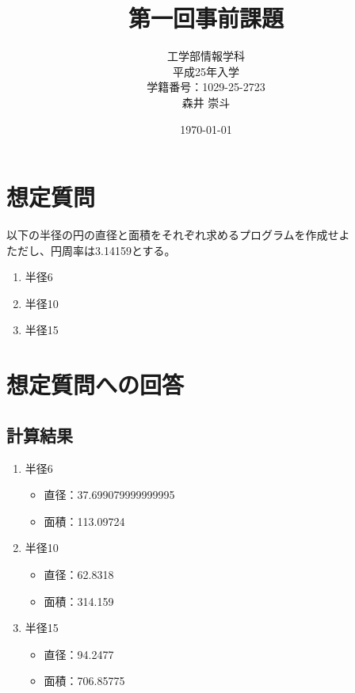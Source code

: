 \documentclass[a4paper,12pt]{article}
\begin{document}
\title{第一回事前課題}
\author{工学部情報学科\\
平成25年入学\\
学籍番号：1029-25-2723\\
森井 崇斗 }
\date{\today}
\maketitle

\lstset{numbers=left,basicstyle=\ttfamily\small,
  commentstyle=\textit, keywordstyle=\bfseries}

\section{想定質問}

以下の半径の円の直径と面積をそれぞれ求めるプログラムを作成せよ\\
ただし、円周率は3.14159とする。\\
\begin{enumerate}
    \item 半径6
    \item 半径10
    \item 半径15
\end{enumerate}

\section{想定質問への回答}


\subsection{計算結果}
\begin{enumerate}
    \item 半径6
        \begin{itemize}
            \item 直径：37.699079999999995
            \item 面積：113.09724
        \end{itemize}
    \item 半径10
        \begin{itemize}
            \item 直径：62.8318
            \item 面積：314.159
        \end{itemize}

    \item 半径15
        \begin{itemize}
            \item 直径：94.2477
            \item 面積：706.85775
        \end{itemize}
\end{enumerate}
\end{document}
